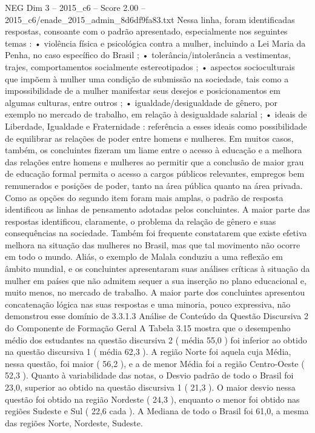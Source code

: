 \begin{textsample}{NEG Dim 3 – 2015\_c6 – Score 2.00 – 2015\_c6/enade\_2015\_admin\_8d6df9fa83.txt}
Nessa linha, foram identificadas respostas, consoante com o padrão apresentado, especialmente nos seguintes temas : • violência física e psicológica contra a mulher, incluindo a Lei Maria da Penha, no caso específico do Brasil ; • tolerância/intolerância a vestimentas, trajes, comportamentos socialmente estereotipados ; • aspectos socioculturais que impõem à mulher uma condição de submissão na sociedade, tais como a impossibilidade de a mulher manifestar seus desejos e posicionamentos em algumas culturas, entre outros ; • igualdade/desigualdade de gênero, por exemplo no mercado de trabalho, em relação à desigualdade salarial ; • ideais de Liberdade, Igualdade e Fraternidade : referência a esses ideais como possibilidade de equilibrar as relações de poder entre homens e mulheres.
Em muitos casos, também, os concluintes fizeram um liame entre o acesso à educação e a melhora das relações entre homens e mulheres ao permitir que a conclusão de maior grau de educação formal permita o acesso a cargos públicos relevantes, empregos bem remunerados e posições de poder, tanto na área pública quanto na área privada.
Como as opções do segundo item foram mais amplas, o padrão de resposta identificou as linhas de pensamento adotadas pelos concluintes.
A maior parte das respostas identificou, claramente, o problema da relação de gênero e suas consequências na sociedade.
Também foi frequente constatarem que existe efetiva melhora na situação das mulheres no Brasil, mas que tal movimento não ocorre em todo o mundo.
Aliás, o exemplo de Malala conduziu a uma reflexão em âmbito mundial, e os concluintes apresentaram suas análises críticas à situação da mulher em países que não admitem sequer a sua inserção no plano educacional e, muito menos, no mercado de trabalho.
A maior parte dos concluintes apresentou concatenação lógica nas suas respostas e uma minoria, pouco expressiva, não demonstrou esse domínio de 3.3.1.3 Análise de Conteúdo da Questão Discursiva 2 do Componente de Formação Geral A Tabela 3.15 mostra que o desempenho médio dos estudantes na questão discursiva 2 ( média 55,0 ) foi inferior ao obtido na questão discursiva 1 ( média 62,3 ).
A região Norte foi aquela cuja Média, nessa questão, foi maior ( 56,2 ), e a de menor Média foi a região Centro-Oeste ( 52,3 ).
Quanto à variabilidade das notas, o Desvio padrão de todo o Brasil foi 23,0, superior ao obtido na questão discursiva 1 ( 21,3 ).
O maior desvio nessa questão foi obtido na região Nordeste ( 24,3 ), enquanto o menor foi obtido nas regiões Sudeste e Sul ( 22,6 cada ).
A Mediana de todo o Brasil foi 61,0, a mesma das regiões Norte, Nordeste, Sudeste.

\end{textsample}
